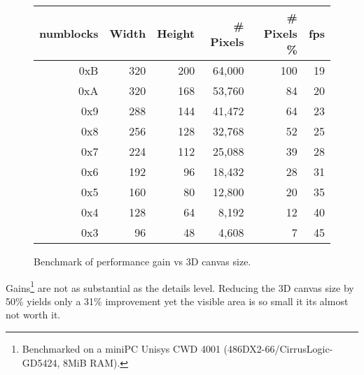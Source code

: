 \begin{figure}[H]
\centering  
\begin{tabularx}{\textwidth}{ R{1}  R{1} R{1} R{1}  R{1.4}  R{0.6} }
  \toprule
  \textbf{numblocks} & \textbf{Width} & \textbf{Height} & \textbf{\# Pixels} & \textbf{\# Pixels \%} & \textbf{fps}\\
  \toprule 

 0xB & 320 & 200 & 64,000 & 100 & 19 \\
 0xA & 320 & 168 & 53,760 &  84 & 20 \\
 0x9 & 288 & 144 & 41,472 &  64 & 23 \\
 0x8 & 256 & 128 & 32,768 &  52 & 25 \\
0x7 & 224 & 112 & 25,088 &  39 & 28 \\
 0x6 & 192 & 96 & 18,432 &  28 & 31  \\
 0x5 & 160 & 80 & 12,800 &  20 & 35  \\
 0x4 & 128 & 64 &  8,192 &  12 & 40  \\
 0x3 &  96 & 48 &  4,608 &   7 & 45  \\
   \toprule
\end{tabularx}
\caption{Benchmark of performance gain vs 3D canvas size.}
\end{figure}


\par
Gains\footnote{Benchmarked on a miniPC Unisys CWD 4001 (486DX2-66/CirrusLogic-GD5424, 8MiB RAM).} are not as substantial as the details level. Reducing the 3D canvas size by 50\% yields only a 31\% improvement yet the visible area is so small it its almost not worth it.\\

\par
{}


